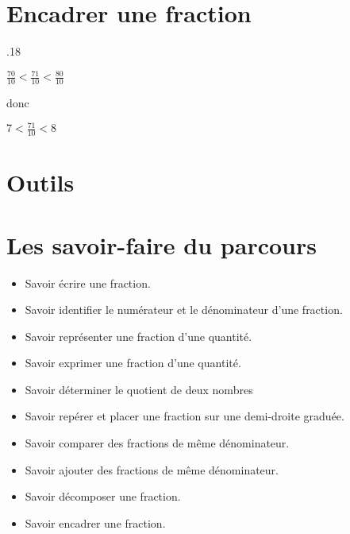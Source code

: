 \documentclass[a4paper,dvipsnames]{article}
\begin{document}

\section{Encadrer une fraction}


{.18\linewidth}{
\begin{Ex}
\begin{center}
$\frac{70}{10}<\frac{71}{10}<\frac{80}{10}$

donc

$7<\frac{71}{10}<8$
\end{center}
\end{Ex}}


\section{Outils}


\section{Les savoir-faire du parcours}

\begin{CpsCol}
\begin{itemize}
\item Savoir écrire une fraction.
\item Savoir identifier le numérateur et le dénominateur d'une fraction.
\item Savoir représenter une fraction d'une quantité.
\item Savoir exprimer une fraction d'une quantité.
\item Savoir déterminer le quotient de deux nombres
\item Savoir repérer et placer une fraction sur une demi-droite graduée.
\item Savoir comparer des fractions de même dénominateur.
\item Savoir ajouter des fractions de même dénominateur.
\item Savoir décomposer une fraction.
\item Savoir encadrer une fraction.
\end{itemize}
\end{CpsCol}
\end{document}
